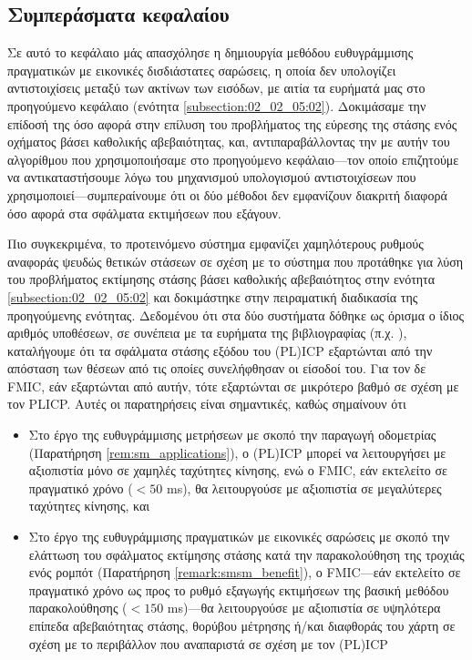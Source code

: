 \subsection{Συμπεράσματα κεφαλαίου}
\label{subsection:02_03_05:01}

Σε αυτό το κεφάλαιο μάς απασχόλησε η δημιουργία μεθόδου ευθυγράμμισης
πραγματικών με εικονικές δισδιάστατες σαρώσεις, η οποία δεν υπολογίζει
αντιστοιχίσεις μεταξύ των ακτίνων των εισόδων, με αιτία τα ευρήματά μας στο
προηγούμενο κεφάλαιο (ενότητα \ref{subsection:02_02_05:02}). Δοκιμάσαμε την
επίδοσή της όσο αφορά στην επίλυση του προβλήματος της εύρεσης της στάσης ενός
οχήματος βάσει καθολικής αβεβαιότητας, και, αντιπαραβάλλοντας την με αυτήν του
αλγορίθμου που χρησιμοποιήσαμε στο προηγούμενο κεφάλαιο---τον οποίο επιζητούμε
να αντικαταστήσουμε λόγω του μηχανισμού υπολογισμού αντιστοιχίσεων που
χρησιμοποιεί---συμπεραίνουμε ότι οι δύο μέθοδοι δεν εμφανίζουν διακριτή διαφορά
όσο αφορά στα σφάλματα εκτιμήσεων που εξάγουν.

Πιο συγκεκριμένα, το προτεινόμενο σύστημα εμφανίζει χαμηλότερους ρυθμούς
αναφοράς ψευδώς θετικών στάσεων σε σχέση με το σύστημα που προτάθηκε για λύση
του προβλήματος εκτίμησης στάσης βάσει καθολικής αβεβαιότητος στην ενότητα
\ref{subsection:02_02_05:02} και δοκιμάστηκε στην πειραματική διαδικασία της
προηγούμενης ενότητας. Δεδομένου ότι στα δύο συστήματα δόθηκε ως όρισμα ο ίδιος
αριθμός υποθέσεων, σε συνέπεια με τα ευρήματα της βιβλιογραφίας (π.χ.
\cite{Olson2009a,bernreiter2021phaser}), καταλήγουμε ότι τα σφάλματα στάσης
εξόδου του (PL)ICP εξαρτώνται από την απόσταση των θέσεων από τις οποίες
συνελήφθησαν οι είσοδοί του. Για τον δε FMIC, εάν εξαρτώνται από αυτήν, τότε
εξαρτώνται σε μικρότερο βαθμό σε σχέση με τον PLICP. Αυτές οι παρατηρήσεις είναι
σημαντικές, καθώς σημαίνουν ότι

\begin{itemize}
  \item Στο έργο της ευθυγράμμισης μετρήσεων με σκοπό την παραγωγή οδομετρίας
        (Παρατήρηση \ref{rem:sm_applications}), ο (PL)ICP μπορεί να λειτουργήσει
        με αξιοπιστία μόνο σε χαμηλές ταχύτητες κίνησης, ενώ ο FMIC, εάν
        εκτελείτο σε πραγματικό χρόνο ($< 50$ ms), θα λειτουργούσε με αξιοπιστία
        σε μεγαλύτερες ταχύτητες κίνησης, και
  \item Στο έργο της ευθυγράμμισης πραγματικών με εικονικές σαρώσεις με σκοπό
        την ελάττωση του σφάλματος εκτίμησης στάσης κατά την παρακολούθηση
        της τροχιάς ενός ρομπότ (Παρατήρηση \ref{remark:smsm_benefit}), ο
        FMIC---εάν εκτελείτο σε πραγματικό χρόνο ως προς το ρυθμό εξαγωγής
        εκτιμήσεων της βασική μεθόδου παρακολούθησης ($< 150$ ms)---θα
        λειτουργούσε με αξιοπιστία σε υψηλότερα επίπεδα αβεβαιότητας στάσης,
        θορύβου μέτρησης ή/και διαφθοράς του χάρτη σε σχέση με το περιβάλλον
        που αναπαριστά σε σχέση με τον (PL)ICP
\end{itemize}

